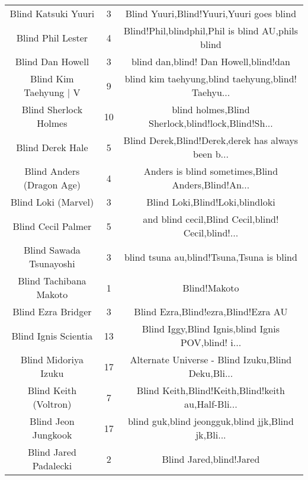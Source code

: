 \begin{table}[h!]
{\begin{tabular}{|c|c|c|}
                               Blind Katsuki Yuuri &      3 &           Blind Yuuri,Blind!Yuuri,Yuuri goes blind \\
                                 Blind Phil Lester &      4 &  Blind!Phil,blindphil,Phil is blind AU,phils blind \\
                                  Blind Dan Howell &      3 &              blind dan,blind! Dan Howell,blind!dan \\
                            Blind Kim Taehyung | V &      9 & blind kim taehyung,blind taehyung,blind! Taehyu... \\
                             Blind Sherlock Holmes &     10 & blind holmes,Blind Sherlock,blind!lock,Blind!Sh... \\
                                  Blind Derek Hale &      5 & Blind Derek,Blind!Derek,derek has always been b... \\
                         Blind Anders (Dragon Age) &      4 & Anders is blind sometimes,Blind Anders,Blind!An... \\
                               Blind Loki (Marvel) &      3 &                    Blind Loki,Blind!Loki,blindloki \\
                                Blind Cecil Palmer &      5 & and blind cecil,Blind Cecil,blind! Cecil,blind!... \\
                           Blind Sawada Tsunayoshi &      3 &          blind tsuna au,blind!Tsuna,Tsuna is blind \\
                            Blind Tachibana Makoto &      1 &                                       Blind!Makoto \\
                                Blind Ezra Bridger &      3 &                Blind Ezra,Blind!ezra,Blind!Ezra AU \\
                              Blind Ignis Scientia &     13 & Blind Iggy,Blind Ignis,blind Ignis POV,blind! i... \\
                              Blind Midoriya Izuku &     17 & Alternate Universe - Blind Izuku,Blind Deku,Bli... \\
                             Blind Keith (Voltron) &      7 & Blind Keith,Blind!Keith,Blind!keith au,Half-Bli... \\
                               Blind Jeon Jungkook &     17 & blind guk,blind jeongguk,blind jjk,Blind jk,Bli... \\
                             Blind Jared Padalecki &      2 &                            Blind Jared,blind!Jared \\

\end{tabular}}
\end{table}
